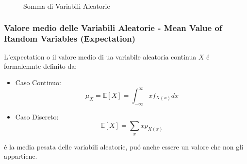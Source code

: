 \begin{figure}[H]
{
                }

                \caption{Somma di Variabili Aleatorie}
                \label{Somma di Variabili Aleatorie}
            \end{figure}
        \subsubsection{Valore medio delle Variabili Aleatorie - Mean Value of Random Variables (Expectation)}\label{Expectation}
            L'expectation o il valore medio di ua variabile aleatoria continua $X$ é formalemnte definito da:
            \begin{itemize}
                \item {Caso Continuo:
                    \[
                        \mu_X = \mathbb{E}[X] = \int_{-\infty}^{\infty} xf_{X(x)}dx
                    \]
                }
                \item {Caso Discreto:
                    \[
                        \mathbb{E}[X] = \sum_{x}xp_{X(x)}
                    \]
                }
            \end{itemize}
            é la media pesata delle variabili aleatorie, puó anche essere un valore che non gli appartiene.
